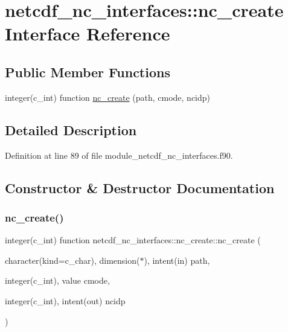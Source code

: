 \hypertarget{interfacenetcdf__nc__interfaces_1_1nc__create}{}\section{netcdf\+\_\+nc\+\_\+interfaces\+:\+:nc\+\_\+create Interface Reference}
\label{interfacenetcdf__nc__interfaces_1_1nc__create}
\subsection*{Public Member Functions}
\begin{DoxyCompactItemize}
\item 
integer(c\+\_\+int) function \hyperlink{interfacenetcdf__nc__interfaces_1_1nc__create_a0b0b7390947bfb5d5a8dea2ad21f5667}{nc\+\_\+create} (path, cmode, ncidp)
\end{DoxyCompactItemize}


\subsection{Detailed Description}


Definition at line 89 of file module\+\_\+netcdf\+\_\+nc\+\_\+interfaces.\+f90.



\subsection{Constructor \& Destructor Documentation}
\mbox{\label{interfacenetcdf__nc__interfaces_1_1nc__create_a0b0b7390947bfb5d5a8dea2ad21f5667}} 
\subsubsection{\texorpdfstring{nc\+\_\+create()}{nc\_create()}}
{\footnotesize\ttfamily integer(c\+\_\+int) function netcdf\+\_\+nc\+\_\+interfaces\+::nc\+\_\+create\+::nc\+\_\+create (\begin{DoxyParamCaption}\item[{character(kind=c\+\_\+char), dimension($\ast$), intent(in)}]{path,  }\item[{integer(c\+\_\+int), value}]{cmode,  }\item[{integer(c\+\_\+int), intent(out)}]{ncidp }\end{DoxyParamCaption})}



